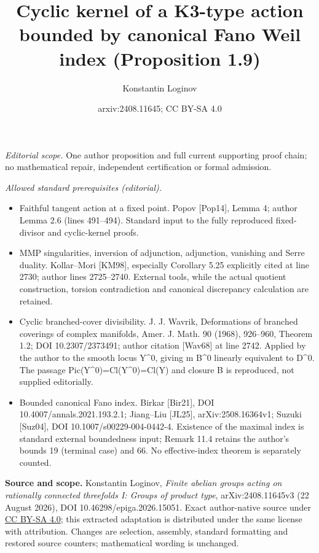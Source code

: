 \documentclass[10pt,a4paper]{article}
\title{Cyclic kernel of a K3-type action bounded by canonical Fano Weil index (Proposition 1.9)}
\author{Konstantin Loginov}
\date{arxiv:2408.11645; CC BY-SA 4.0}
\theoremstyle{definition}
\theoremstyle{remark}
\begin{document}
\maketitle
\noindent\textit{Editorial scope.} One author proposition and full current supporting proof chain; no mathematical repair, independent certification or formal admission.\par\medskip
\noindent\textit{Allowed standard prerequisites (editorial).}\begin{itemize}
\item Faithful tangent action at a fixed point. Popov [Pop14], Lemma 4; author Lemma 2.6 (lines 491–494). Standard input to the fully reproduced fixed-divisor and cyclic-kernel proofs.
\item MMP singularities, inversion of adjunction, adjunction, vanishing and Serre duality. Kollar–Mori [KM98], especially Corollary 5.25 explicitly cited at line 2730; author lines 2725–2740. External tools, while the actual quotient construction, torsion contradiction and canonical discrepancy calculation are retained.
\item Cyclic branched-cover divisibility. J. J. Wavrik, Deformations of branched coverings of complex manifolds, Amer. J. Math. 90 (1968), 926–960, Theorem 1.2; DOI 10.2307/2373491; author citation [Wav68] at line 2742. Applied by the author to the smooth locus Y\textasciicircum{}0, giving m B\textasciicircum{}0 linearly equivalent to D\textasciicircum{}0. The passage Pic(Y\textasciicircum{}0)=Cl(Y\textasciicircum{}0)=Cl(Y) and closure B is reproduced, not supplied editorially.
\item Bounded canonical Fano index. Birkar [Bir21], DOI 10.4007/annals.2021.193.2.1; Jiang–Liu [JL25], arXiv:2508.16364v1; Suzuki [Suz04], DOI 10.1007/s00229-004-0442-4. Existence of the maximal index is standard external boundedness input; Remark 11.4 retains the author’s bounds 19 (terminal case) and 66. No effective-index theorem is separately counted.
\end{itemize}\medskip
\noindent\textbf{Source and scope.} Konstantin Loginov, \emph{Finite abelian groups acting on rationally connected threefolds I: Groups of product type}, arXiv:2408.11645v3 (22 August 2026), DOI 10.46298/epiga.2026.15051. Exact author-native source under \href{https://creativecommons.org/licenses/by-sa/4.0/}{CC BY-SA 4.0}; this extracted adaptation is distributed under the same license with attribution. Changes are selection, assembly, standard formatting and restored source counters; mathematical wording is unchanged.
\end{document}
